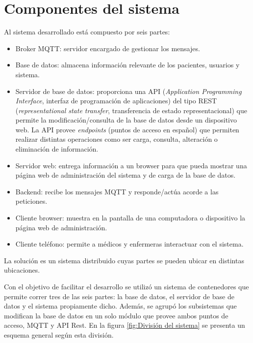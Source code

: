 \section{Componentes del sistema}
\label{sec:Sistema General}

Al sistema desarrollado está compuesto por seis partes:

\begin{itemize}
\item  Broker MQTT: servidor encargado de gestionar los mensajes.
\item  Base de datos: almacena información relevante de los pacientes, usuarios y sistema.
\item  Servidor de base de datos: proporciona una API (\textit{Application Programming Interface}, interfaz de programación de aplicaciones) del tipo REST (\textit{representational state transfer}, transferencia de estado representacional) que permite la modificación/consulta de la base de datos desde un dispositivo web. La API provee \textit{endpoints} (puntos de acceso en español) que permiten realizar distintas operaciones como ser carga, consulta, alteración o eliminación de información.
\item  Servidor web: entrega información a un browser para que pueda mostrar una página web de administración del sistema y de carga de la base de datos.
\item  Backend: recibe los mensajes MQTT y responde/actúa acorde a las peticiones.
\item Cliente browser: muestra en la pantalla de una computadora o dispositivo la página web de administración.
\item Cliente teléfono: permite a médicos y enfermeras interactuar con el sistema.
\end{itemize}

La solución es un sistema distribuido cuyas partes se pueden ubicar en distintas ubicaciones. 

Con el objetivo de facilitar el desarrollo se utilizó un sistema de contenedores que permite correr tres de las seis partes: la base de datos, el servidor de base de datos y el sistema propiamente dicho. Además, se  agrupó los subsistemas que modifican la base de datos en un solo módulo que provee ambos puntos de acceso, MQTT y API Rest. En la figura  \ref{fig:División del sistema} se presenta un esquema general según esta división.


